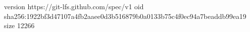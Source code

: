 version https://git-lfs.github.com/spec/v1
oid sha256:1922bf3d47107a4fb2aaee0d3b516879b0a0133b75c4f0ec94a7beaddb99ea19
size 12266
